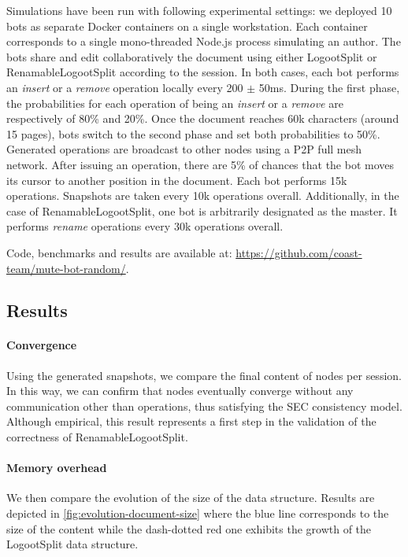 \documentclass[sigplan,10pt,authorversion]{acmart}
\begin{document}
Simulations have been run with following experimental settings: we deployed 10 bots as separate Docker containers on a single workstation.
Each container corresponds to a single mono-threaded Node.js process simulating an author.
The bots share and edit collaboratively the document using either LogootSplit or RenamableLogootSplit according to the session.
In both cases, each bot performs an \emph{insert} or a \emph{remove} operation locally every 200 $\pm$ 50ms.
During the first phase, the probabilities for each operation of being an \emph{insert} or a \emph{remove} are respectively of 80\% and 20\%.
Once the document reaches 60k characters (around 15 pages), bots switch to the second phase and set both probabilities to 50\%.
Generated operations are broadcast to other nodes using a \ac{P2P} full mesh network.
After issuing an operation, there are 5\% of chances that the bot moves its cursor to another position in the document.
Each bot performs 15k operations.
Snapshots are taken every 10k operations overall.
Additionally, in the case of RenamableLogootSplit, one bot is arbitrarily designated as the master.
It performs \emph{rename} operations every 30k operations overall.

Code, benchmarks and results are available at: \url{https://github.com/coast-team/mute-bot-random/}.

\subsection{Results}

\paragraph{Convergence}

Using the generated snapshots, we compare the final content of nodes per session.
In this way, we can confirm that nodes eventually converge without any communication other than operations, thus satisfying the \ac{SEC} consistency model.
Although empirical, this result represents a first step in the validation of the correctness of RenamableLogootSplit.

\paragraph{Memory overhead}

We then compare the evolution of the size of the data structure.
Results are depicted in \autoref{fig:evolution-document-size} where the blue line corresponds to the size of the content while the dash-dotted red one exhibits the growth of the LogootSplit data structure.
\end{document}
